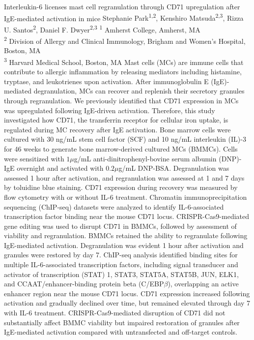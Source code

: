 \makeabstract
    {
    Interleukin-6 licenses mast cell regranulation through CD71 upregulation after IgE-mediated activation in mice 
    }
    {
    Stephanie Park\textsuperscript{1,2}, Kenshiro Matsuda\textsuperscript{2,3}, Rizza U. Santos\textsuperscript{2}, Daniel F. Dwyer\textsuperscript{2,3}
    }
    {
    \textsuperscript{1} Amherst College, Amherst, MA \\
\textsuperscript{2} Division of Allergy and Clinical Immunology, Brigham and Women{\textquoteright}s Hospital, Boston, MA \\
\textsuperscript{3} Harvard Medical School, Boston, MA
    }
    {
    Mast cells (MCs) are immune cells that contribute to allergic inflammation by releasing mediators including histamine, tryptase, and leukotrienes upon activation. After immunoglobulin E (IgE)-mediated degranulation, MCs can recover and replenish their secretory granules through regranulation. We previously identified that CD71 expression in MCs was upregulated following IgE-driven activation. Therefore, this study investigated how CD71, the transferrin receptor for cellular iron uptake, is regulated during MC recovery after IgE activation.
    }
    {
    Bone marrow cells were cultured with 30 ng/mL stem cell factor (SCF) and 10 ng/mL interleukin (IL)-3 for 4{\textendash}6 weeks to generate bone marrow-derived cultured MCs (BMMCs). Cells were sensitized with $1\mu$g/mL anti-dinitrophenyl-bovine serum albumin (DNP)-IgE overnight and activated with $0.2\mu$g/mL DNP-BSA. Degranulation was assessed 1 hour after activation, and regranulation was assessed at 1 and 7 days by toluidine blue staining. CD71 expression during recovery was measured by flow cytometry with or without IL-6 treatment. Chromatin immunoprecipitation sequencing (ChIP-seq) datasets were analyzed to identify IL-6-associated transcription factor binding near the mouse CD71 locus. CRISPR-Cas9-mediated gene editing was used to disrupt CD71 in BMMCs, followed by assessment of viability and regranulation.
    }
    {
    BMMCs retained the ability to regranulate following IgE-mediated activation. Degranulation was evident 1 hour after activation and granules were restored by day 7. ChIP-seq analysis identified binding sites for multiple IL-6-associated transcription factors, including signal transducer and activator of transcription (STAT) 1, STAT3, STAT5A, STAT5B, JUN, ELK1, and CCAAT/enhancer-binding protein beta (C/EBP\ensuremath{\beta}), overlapping an active enhancer region near the mouse CD71 locus. CD71 expression increased following activation and gradually declined over time, but remained elevated through day 7 with IL-6 treatment. CRISPR-Cas9-mediated disruption of CD71 did not substantially affect BMMC viability but impaired restoration of granules after IgE-mediated activation compared with untransfected and off-target controls.
    }

